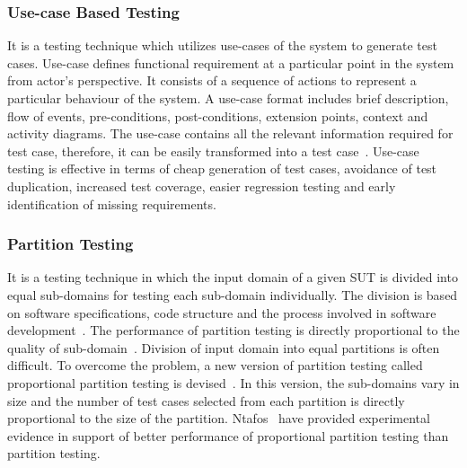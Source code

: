\subsubsection{Use-case Based Testing}
It is a testing technique which utilizes use-cases of the system to generate test cases. Use-case defines functional requirement at a particular point in the system from actor's perspective. It consists of a sequence of actions to represent a particular behaviour of the system. A use-case format includes brief description, flow of events, pre-conditions, post-conditions, extension points, context and activity diagrams. The use-case contains all the relevant information required for test case, therefore, it can be easily transformed into a test case~\cite{armour2000advanced}. Use-case testing is effective in terms of cheap generation of test cases, avoidance of test duplication, increased test coverage, easier regression testing and early identification of missing requirements.  

\subsubsection{Partition Testing}
It is a testing technique in which the input domain of a given SUT is divided into equal sub-domains for testing each sub-domain individually. The division is based on software specifications, code structure and the process involved in software development~\cite{hamlet1990partition}. The performance of partition testing is directly proportional to the quality of sub-domain~\cite{weyuker1991analyzing}. Division of input domain into equal partitions is often difficult. To overcome the problem, a new version of partition testing called proportional partition testing is devised~\cite{chan1996proportional}. In this version, the sub-domains vary in size and the number of test cases selected from each partition is directly proportional to the size of the partition. Ntafos~\cite{ntafos1998random} have provided experimental evidence in support of better performance of proportional partition testing than partition testing.


